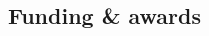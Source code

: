 \documentclass[10pt]{article}
\begin{document}
\begin{multicols}{2}

\subsection*{Funding \& awards} %



\end{multicols}
\end{document}
